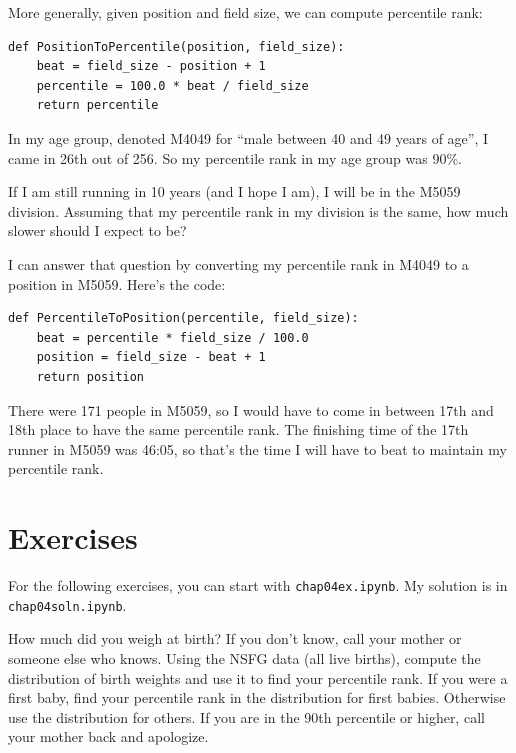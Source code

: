 \documentclass[12pt]{book}
\begin{document}
More generally, given position and field size, we can compute
percentile rank:

\begin{verbatim}
def PositionToPercentile(position, field_size):
    beat = field_size - position + 1
    percentile = 100.0 * beat / field_size
    return percentile
\end{verbatim}

In my age group, denoted M4049 for ``male between 40 and 49 years of
age'', I came in 26th out of 256.  So my percentile rank in my age
group was 90\%.

If I am still running in 10 years (and I hope I am), I will be in
the M5059 division.  Assuming that my percentile rank in my division
is the same, how much slower should I expect to be?

I can answer that question by converting my percentile rank in M4049
to a position in M5059.  Here's the code:

\begin{verbatim}
def PercentileToPosition(percentile, field_size):
    beat = percentile * field_size / 100.0
    position = field_size - beat + 1
    return position
\end{verbatim}

There were 171 people in M5059, so I would have to come in between
17th and 18th place to have the same percentile rank.  The finishing
time of the 17th runner in M5059 was 46:05, so that's the time I will
have to beat to maintain my percentile rank.


\section{Exercises}

For the following exercises, you can start with \verb"chap04ex.ipynb".
My solution is in \verb"chap04soln.ipynb".

\begin{exercise}
How much did you weigh at birth?  If you don't know, call your mother
or someone else who knows.  Using the NSFG data (all live births),
compute the distribution of birth weights and use it to find your
percentile rank.  If you were a first baby, find your percentile rank
in the distribution for first babies.  Otherwise use the distribution
for others.  If you are in the 90th percentile or higher, call your
mother back and apologize.

\end{exercise}
\end{document}
